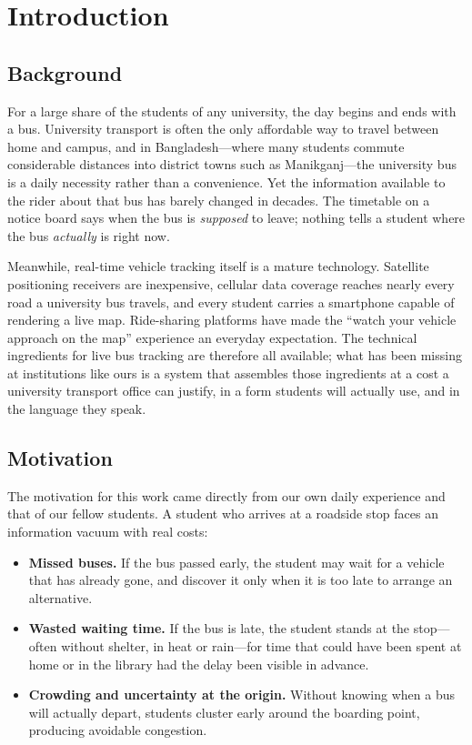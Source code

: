 \chapter{Introduction}
\label{ch:intro}

\section{Background}
For a large share of the students of any university, the day begins and
ends with a bus. University transport is often the only affordable way to
travel between home and campus, and in Bangladesh---where many students
commute considerable distances into district towns such as Manikganj---the
university bus is a daily necessity rather than a convenience. Yet the
information available to the rider about that bus has barely changed in
decades. The timetable on a notice board says when the bus is
\emph{supposed} to leave; nothing tells a student where the bus
\emph{actually} is right now.

Meanwhile, real-time vehicle tracking itself is a mature technology.
Satellite positioning receivers are inexpensive, cellular data coverage
reaches nearly every road a university bus travels, and every student
carries a smartphone capable of rendering a live map. Ride-sharing
platforms have made the ``watch your vehicle approach on the map''
experience an everyday expectation. The technical ingredients for live bus
tracking are therefore all available; what has been missing at
institutions like ours is a system that assembles those ingredients at a
cost a university transport office can justify, in a form students will
actually use, and in the language they speak.

\section{Motivation}
The motivation for this work came directly from our own daily experience
and that of our fellow students. A student who arrives at a roadside stop
faces an information vacuum with real costs:

\begin{itemize}
  \item \textbf{Missed buses.} If the bus passed early, the student may
  wait for a vehicle that has already gone, and discover it only when it
  is too late to arrange an alternative.
  \item \textbf{Wasted waiting time.} If the bus is late, the student
  stands at the stop---often without shelter, in heat or rain---for time
  that could have been spent at home or in the library had the delay been
  visible in advance.
  \item \textbf{Crowding and uncertainty at the origin.} Without knowing
  when a bus will actually depart, students cluster early around the
  boarding point, producing avoidable congestion.
\end{itemize}


